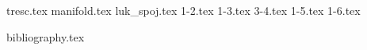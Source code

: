 \documentclass[a4paper,11pt]{article}
\begin{document}

{tresc.tex}
{manifold.tex}
{luk_spoj.tex}
{1-2.tex}
{1-3.tex}
{3-4.tex}
{1-5.tex}
{1-6.tex}

{bibliography.tex}
\end{document}
